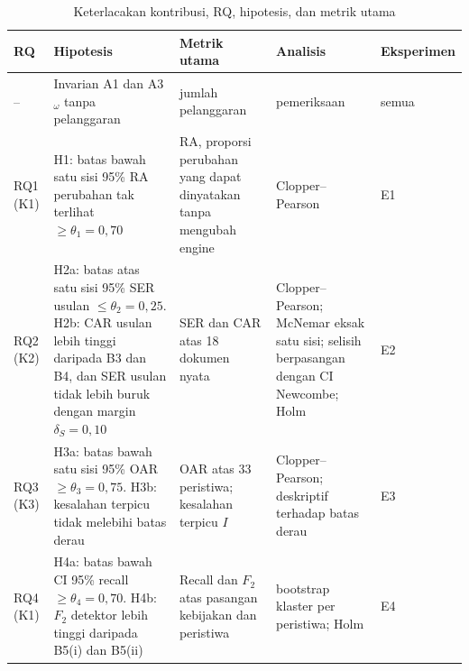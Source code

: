 \documentclass[conference]{IEEEtran}
\makeatletter
\DeclareRobustCommand{\en}[1]{{\usefont{\f@encoding}{\f@family}{\f@series}{it}#1\/}}
\makeatother
\begin{document}
\begin{table}[t]
\centering
\caption{Keterlacakan kontribusi, RQ, hipotesis, dan metrik utama}
\label{tab:lacak}
\scriptsize
\begin{tabularx}{\textwidth}{@{}P{1.2cm} L P{4.0cm} P{3.6cm} P{1.3cm}@{}}
\toprule
\textbf{RQ} & \textbf{Hipotesis} & \textbf{Metrik utama} & \textbf{Analisis} & \textbf{Eksperimen} \\
\midrule
-- & Invarian A1 dan A3$_\omega$ tanpa pelanggaran & jumlah pelanggaran & pemeriksaan & semua \\
RQ1 (K1) & H1: batas bawah satu sisi 95\% RA perubahan tak terlihat $\geq \theta_1 = 0{,}70$ & RA, proporsi perubahan yang dapat dinyatakan tanpa mengubah \en{engine} & Clopper--Pearson & E1 \\
RQ2 (K2) & H2a: batas atas satu sisi 95\% SER usulan $\leq \theta_2 = 0{,}25$. H2b: CAR usulan lebih tinggi daripada B3 dan B4, dan SER usulan tidak lebih buruk dengan margin $\delta_S = 0{,}10$ & SER dan CAR atas 18 dokumen nyata & Clopper--Pearson; McNemar eksak satu sisi; selisih berpasangan dengan CI Newcombe; Holm & E2 \\
RQ3 (K3) & H3a: batas bawah satu sisi 95\% OAR $\geq \theta_3 = 0{,}75$. H3b: kesalahan terpicu tidak melebihi batas derau & OAR atas 33 peristiwa; kesalahan terpicu $I$ & Clopper--Pearson; deskriptif terhadap batas derau & E3 \\
RQ4 (K1) & H4a: batas bawah CI 95\% \en{recall} $\geq \theta_4 = 0{,}70$. H4b: $F_2$ detektor lebih tinggi daripada B5(i) dan B5(ii) & \en{Recall} dan $F_2$ atas pasangan kebijakan dan peristiwa & \en{bootstrap} klaster per peristiwa; Holm & E4 \\
\bottomrule
\end{tabularx}
\end{table}
\end{document}
